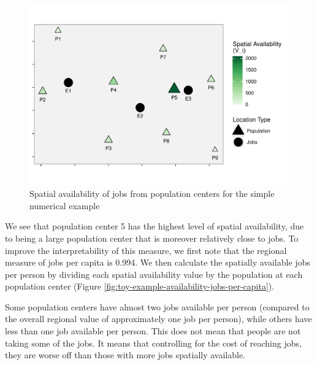 \documentclass[]{elsarticle} %
\begin{document}
\begin{figure}
\includegraphics[width=1\linewidth]{Spatial-Availability_files/figure-latex/toy-example-availability-jobs-1} \caption{\label{fig:toy-example-availability-jobs}Spatial availability of jobs from population centers for the simple numerical example}\label{fig:toy-example-availability-jobs}
\end{figure}

We see that population center 5 has the highest level of spatial
availability, due to being a large population center that is moreover
relatively close to jobs. To improve the interpretability of this
measure, we first note that the regional measure of jobs per capita is
0.994. We then calculate the spatially available jobs per person by
dividing each spatial availability value by the population at each
population center (Figure
\ref{fig:toy-example-availability-jobs-per-capita}).

Some population centers have almost two jobs available per person
(compared to the overall regional value of approximately one job per
person), while others have less than one job available per person. This
does not mean that people are not taking some of the jobs. It means that
controlling for the cost of reaching jobs, they are worse off than those
with more jobs spatially available.
\end{document}
